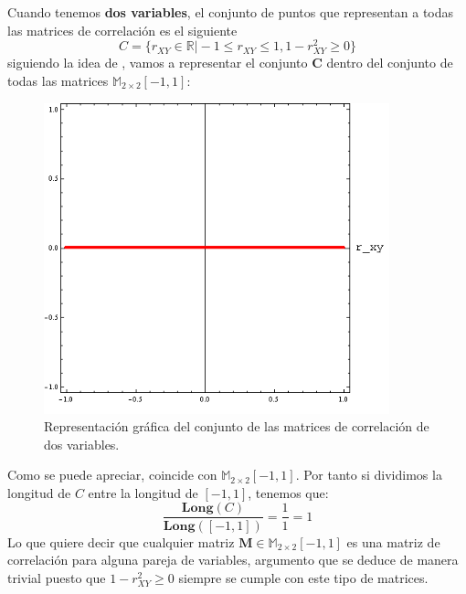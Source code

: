 \documentclass[a4paper,openright,12pt]{report}
\begin{document}
Cuando tenemos \textbf{dos variables}, el conjunto de puntos que representan a todas las matrices de correlación es el siguiente $$C=\lbrace r_{XY}\in \mathbb{R} \vert -1\leq r_{XY} \leq 1, 1-r_{XY}^{2} \geq 0\rbrace$$ siguiendo la idea de \cite{Rousseeuw1994}, vamos a representar el conjunto \textbf{C} dentro del conjunto de todas las matrices $\mathbb{M}_{2\times  2}[-1,1]$:
\newpage
\medskip 
\begin{figure}[htb]
\begin{center}
\includegraphics[width=10cm]{matriz_correlacion_2vars}
\caption{Representación gráfica del conjunto de las matrices de correlación de dos variables.}
\label{Fig_matriz_correlacion_2vars}
\end{center}
\end{figure}

Como se puede apreciar, coincide con $\mathbb{M}_{2\times  2}[-1,1]$. Por tanto si dividimos la longitud de $C$ entre la longitud de $[-1,1]$, tenemos que: $$\dfrac{\mathbf{Long}(C)}{\mathbf{Long}([-1,1])}=\dfrac{1}{1}=1$$
Lo que quiere decir que cualquier matriz $\mathbf{M}\in \mathbb{M}_{2\times  2}[-1,1]$ es una matriz de correlación para alguna pareja de variables, argumento que se deduce de manera trivial puesto que $1-r_{XY}^{2} \geq 0$ siempre se cumple con este tipo de matrices.
\end{document}
